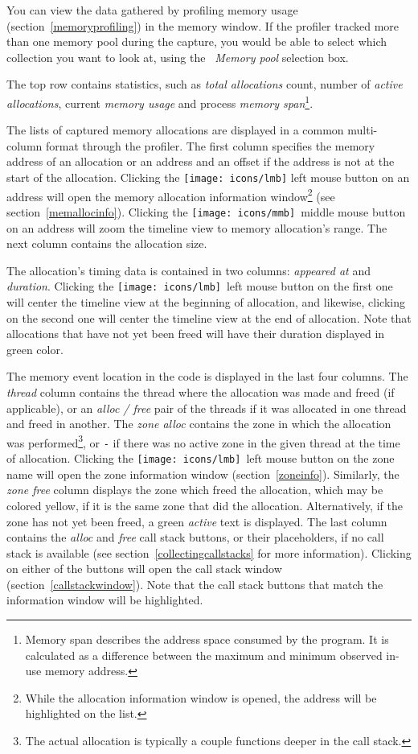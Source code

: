 \documentclass[hidelinks,titlepage,a4paper,twoside]{article}
\newcommand{\LMB}{\texttt{[image: icons/lmb]}}
\newcommand{\MMB}{\texttt{[image: icons/mmb]}}
\begin{document}
You can view the data gathered by profiling memory usage (section~\ref{memoryprofiling}) in the memory window. If the profiler tracked more than one memory pool during the capture, you would be able to select which collection you want to look at, using the \emph{\faArchive{}~Memory pool} selection box.

The top row contains statistics, such as \emph{total allocations} count, number of \emph{active allocations}, current \emph{memory usage} and process \emph{memory span}\footnote{Memory span describes the address space consumed by the program. It is calculated as a difference between the maximum and minimum observed in-use memory address.}.

The lists of captured memory allocations are displayed in a common multi-column format through the profiler. The first column specifies the memory address of an allocation or an address and an offset if the address is not at the start of the allocation. Clicking the \LMB{} left mouse button on an address will open the memory allocation information window\footnote{While the allocation information window is opened, the address will be highlighted on the list.} (see section~\ref{memallocinfo}). Clicking the \MMB{}~middle mouse button on an address will zoom the timeline view to memory allocation's range. The next column contains the allocation size.

The allocation's timing data is contained in two columns: \emph{appeared at} and \emph{duration}. Clicking the \LMB{}~left mouse button on the first one will center the timeline view at the beginning of allocation, and likewise, clicking on the second one will center the timeline view at the end of allocation. Note that allocations that have not yet been freed will have their duration displayed in green color.

The memory event location in the code is displayed in the last four columns. The \emph{thread} column contains the thread where the allocation was made and freed (if applicable), or an \emph{alloc / free} pair of the threads if it was allocated in one thread and freed in another. The \emph{zone alloc} contains the zone in which the allocation was performed\footnote{The actual allocation is typically a couple functions deeper in the call stack.}, or \texttt{-} if there was no active zone in the given thread at the time of allocation. Clicking the \LMB{}~left mouse button on the zone name will open the zone information window (section~\ref{zoneinfo}). Similarly, the \emph{zone free} column displays the zone which freed the allocation, which may be colored yellow, if it is the same zone that did the allocation. Alternatively, if the zone has not yet been freed, a green \emph{active} text is displayed. The last column contains the \emph{alloc} and \emph{free} call stack buttons, or their placeholders, if no call stack is available (see section~\ref{collectingcallstacks} for more information). Clicking on either of the buttons will open the call stack window (section~\ref{callstackwindow}). Note that the call stack buttons that match the information window will be highlighted.
\end{document}
